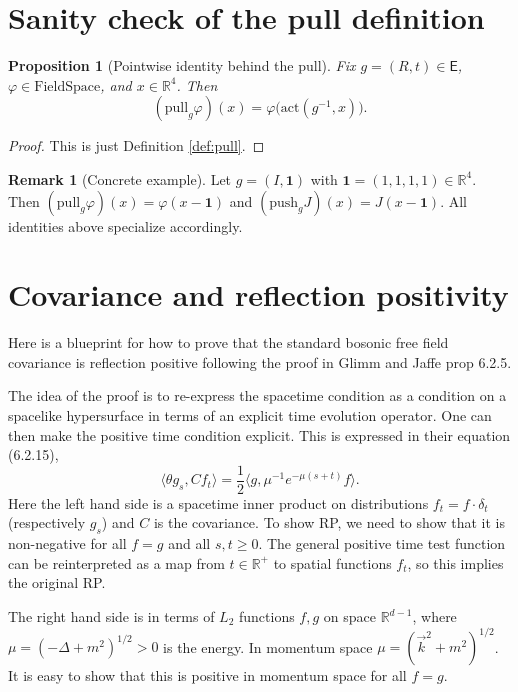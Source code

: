 \documentclass{article}
\newcommand{\Rd}{\mathbb{R}^4}
\newcommand{\1}{\mathbbm{1}}
\newcommand{\push}{\mathrm{push}}
\newcommand{\pull}{\mathrm{pull}}
\theoremstyle{plain}
\newtheorem{prop}[theorem]{Proposition}
\theoremstyle{definition}
\newtheorem{remark}[theorem]{Remark}
\numberwithin{equation}{section}
\def\IR{\mathbb{R}}
\newcommand{\be}{\begin{equation}}
\newcommand{\ee}{\end{equation}}
\begin{document}
\section{Sanity check of the pull definition}

\begin{prop}[Pointwise identity behind the pull]\label{prop:check}
Fix $g=(R,t)\in\mathsf{E}$, $\varphi\in\mathrm{FieldSpace}$, and $x\in\Rd$. Then
\[
(\pull_g \varphi)(x)
=\varphi\bigl(\mathrm{act}(g^{-1},x)\bigr).
\]
\end{prop}

\begin{proof}
This is just Definition \ref{def:pull}.
\end{proof}

\begin{remark}[Concrete example]
Let $g=(I,\mathbf{1})$ with $\mathbf{1}=(1,1,1,1)\in\Rd$. Then $(\pull_g\varphi)(x)=\varphi(x-\mathbf{1})$ and $(\push_g J)(x)=J(x-\mathbf{1})$. All identities above specialize accordingly.
\end{remark}

\section{Covariance and reflection positivity}

Here is a blueprint for how to prove that the standard bosonic free field covariance is reflection positive
following the proof in Glimm and Jaffe prop 6.2.5.

The idea of the proof is to re-express the spacetime condition as a condition on a spacelike hypersurface
in terms of an explicit time evolution operator.  One can then make the positive time condition explicit.
This is expressed in their equation (6.2.15),
\be\label{eq:spatialRP}
\langle \theta g_s, C f_t \rangle = \frac{1}{2} \langle g, \mu^{-1} e^{-\mu(s+t)} f\rangle .
\ee
Here the left hand side is a spacetime inner product on distributions $f_t = f \cdot \delta_t$
(respectively $g_s$) and $C$ is the covariance.  To show RP, we need to show that it is non-negative
for all $f=g$ and all $s,t\ge 0$.  The general positive time test function can be reinterpreted as
a map from $t\in\IR^+$ to spatial functions $f_t$, so this implies the original RP.

The right hand side is in terms of $L_2$ functions $f,g$ on space $\IR^{d-1}$, where $\mu=(-\Delta+m^2)^{1/2} > 0$ is
the energy.  In momentum space $\mu=(\vec k^2+m^2)^{1/2}$.
It is easy to show that this is positive in momentum space for all $f=g$.
\end{document}

